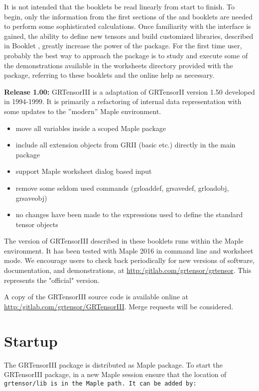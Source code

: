 \documentclass{article}
\begin{document}
It is not intended that the booklets be read linearly from start to
finish. To begin, only the information from the first sections of the
\textsl{\grMakegTitle} and \textsl{\grCalcTitle} booklets are needed
to perform some sophisticated calculations. Once familiarity with the
interface is gained, the ability to define new tensors and build
customized libraries, described in Booklet \grDefRef, greatly increase
the power of the package.  For the first time user, probably the best
way to approach the package is to study and execute some of the
demonstrations available in the worksheets directory provided with 
the package, referring to these booklets and the online help as
necessary.

\textbf{Release 1.00:} GRTensorIII is a adaptation of GRTensorII
version 1.50 developed in 1994-1999. It is primarily a refactoring
of internal data representation with some updates to the ''modern''
Maple environment. \\
\begin{itemize}
  \item move all variables inside a scoped Maple package
  \item include all extension objects from GRII (basic etc.) directly
  in the main package
  \item support Maple worksheet dialog based input
  \item remove some seldom used commands (grloaddef, grsavedef, 
  grloadobj, grsaveobj)
  \item no changes have been made to the expressions used to define
  the standard tensor objects\\
\end{itemize}

The version of GRTensorIII described in these booklets runs within the
Maple environment. It has been tested with Maple 2016 in command line and
worksheet mode. 
We encourage users to check back periodically for new
versions of software, documentation, and demonstrations, at \href{url}{http:/gitlab.com/grtensor/grtensor}.
This represents the "official" version. 

A copy of the GRTensorIII source code is available online at 
\href{url}{http:/gitlab.com/grtensor/GRTensorIII}. Merge requests
will be considered. 

%
\section{Startup}
The GRTensorIII package is distributed as Maple package. 
To start the GRTensorIII package, in a new Maple session ensure
that the location of \text\tt{grtensor/lib} is in the Maple path. It can be added
by:\\
\end{document}

